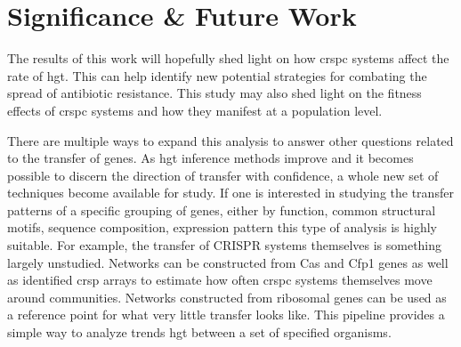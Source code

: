 \documentclass[12pt,letter]{article}
\begin{document}
\section*{\huge Significance \& Future Work}
The results of this work will hopefully shed light on how \ac{crspc} systems affect the rate of \ac{hgt}.
This can help identify new potential strategies for combating the spread of antibiotic resistance.
This study may also shed light on the fitness effects of \ac{crspc} systems and how they manifest at a population level.\par
There are multiple ways to expand this analysis to answer other questions related to the transfer of genes.
As \ac{hgt} inference methods improve and it becomes possible to discern the direction of transfer with confidence, a whole new set of techniques become available for study.
If one is interested in studying the transfer patterns of a specific grouping of genes, either by function, common structural motifs, sequence composition, expression pattern this type of analysis is highly suitable.
For example, the transfer of CRISPR systems themselves is something largely unstudied.
Networks can be constructed from Cas and Cfp1 genes as well as identified \ac{crsp} arrays to estimate how often \ac{crspc} systems themselves move around communities.
Networks constructed from ribosomal genes can be used as a reference point for what very little transfer looks like.
This pipeline provides a simple way to analyze trends \ac{hgt} between a set of specified organisms.
\printbibliography
\end{document}
